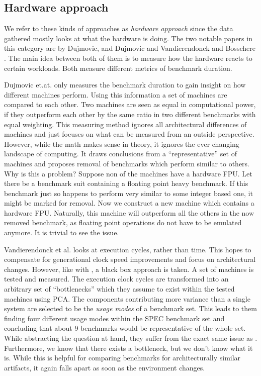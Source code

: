 \documentclass[../bachelor_paper.tex]{subfiles}
\begin{document}
\subsection{Hardware approach}
We refer to these kinds of approaches as \textit{hardware approach} since the data gathered mostly looks at what the hardware is doing. The two notable papers in this category are by Dujmovic, and Dujmovic \cite{dujmovicEvolutionEvaluationSPEC1998} and Vandierendonck and Bosschere \cite{vandierendonckManyBenchmarksStress}. The main idea between both of them is to measure how the hardware reacts to certain workloads. Both measure different metrics of benchmark duration. 

Dujmovic et.at. \cite{dujmovicEvolutionEvaluationSPEC1998} only measures the benchmark duration to gain insight on how different machines perform. Using this information a set of machines are compared to each other. Two machines are seen as equal in computational power, if they outperform each other by the same ratio in two different benchmarks with equal weighting. This measuring method ignores all architectural differences of machines and just focuses on what can be measured from an outside perspective.\\
However, while the math makes sense in theory, it ignores the ever changing landscape of computing. It draws conclusions from a ``representative'' set of machines and proposes removal of benchmarks which perform similar to others. Why is this a problem? Suppose non of the machines have a hardware \ac{FPU}. Let there be a benchmark suit containing a floating point heavy benchmark. If this benchmark just so happens to perform very similar to some integer based one, it might be marked for removal. Now we construct a new machine which contains a hardware \ac{FPU}. Naturally, this machine will outperform all the others in the now removed benchmark, as floating point operations do not have to be emulated anymore. It is trivial to see the issue.

Vandierendonck et al. \cite{vandierendonckManyBenchmarksStress} looks at execution cycles, rather than time. This hopes to compensate for generational clock speed improvements and focus on architectural changes. However, like with \cite{dujmovicEvolutionEvaluationSPEC1998}, a black box approach is taken. A set of machines is tested and measured. The execution clock cycles are transformed into an arbitrary set of ``bottlenecks'' which they assume to exist within the tested machines using \ac{PCA}. The components contributing more variance than a single system are selected to be the \textit{usage modes} of a benchmark set. This leads to them finding four different usage modes within the \ac{SPEC} benchmark set and concluding that about 9 benchmarks would be representative of the whole set.\\
While abstracting the question at hand, they suffer from the exact same issue as \cite{dujmovicEvolutionEvaluationSPEC1998}. Furthermore, we know that there exists a bottleneck, but we don't know what it is. While this is helpful for comparing benchmarks for architecturally similar artifacts, it again falls apart as soon as the environment changes.
\end{document}
